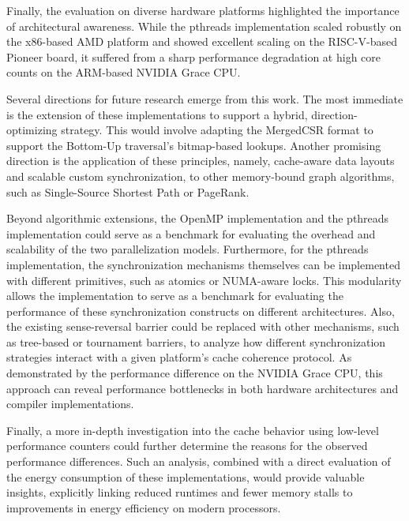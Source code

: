 Finally, the evaluation on diverse hardware platforms highlighted the importance of architectural awareness. While the pthreads implementation scaled robustly on the x86-based AMD platform and showed excellent scaling on the RISC-V-based Pioneer board, it suffered from a sharp performance degradation at high core counts on the ARM-based NVIDIA Grace CPU.

Several directions for future research emerge from this work. The most immediate is the extension of these implementations to support a hybrid, direction-optimizing strategy. This would involve adapting the MergedCSR format to support the Bottom-Up traversal's bitmap-based lookups. Another promising direction is the application of these principles, namely, cache-aware data layouts and scalable custom synchronization, to other memory-bound graph algorithms, such as Single-Source Shortest Path or PageRank.

Beyond algorithmic extensions, the OpenMP implementation and the pthreads implementation could serve as a benchmark for evaluating the overhead and scalability of the two parallelization models. Furthermore, for the pthreads implementation, the synchronization mechanisms themselves can be implemented with different primitives, such as atomics or NUMA-aware locks. This modularity allows the implementation to serve as a benchmark for evaluating the performance of these synchronization constructs on different architectures. Also, the existing sense-reversal barrier could be replaced with other mechanisms, such as tree-based or tournament barriers, to analyze how different synchronization strategies interact with a given platform's cache coherence protocol. As demonstrated by the performance difference on the NVIDIA Grace CPU, this approach can reveal performance bottlenecks in both hardware architectures and compiler implementations.

Finally, a more in-depth investigation into the cache behavior using low-level performance counters could further determine the reasons for the observed performance differences. Such an analysis, combined with a direct evaluation of the energy consumption of these implementations, would provide valuable insights, explicitly linking reduced runtimes and fewer memory stalls to improvements in energy efficiency on modern processors.